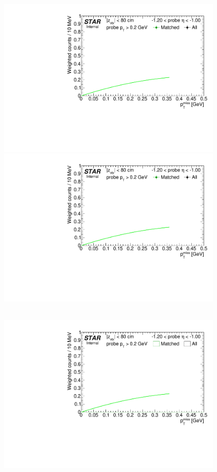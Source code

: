 \begin{figure}
{  \includegraphics[width=\linewidth,page=4]{graphics/systematicsEfficiency/TOF_tagAndProbe/Fitting_effVsEta_data.CPT.pdf}\\
  \includegraphics[width=\linewidth,page=5]{graphics/systematicsEfficiency/TOF_tagAndProbe/Fitting_effVsEta_data.CPT.pdf}
}~
\parbox{0.495\textwidth}{
  \centering
  \includegraphics[width=\linewidth,page=2]{graphics/systematicsEfficiency/TOF_tagAndProbe/Fitting_effVsEta_mc.CPT.pdf}\\
}
\end{figure}
